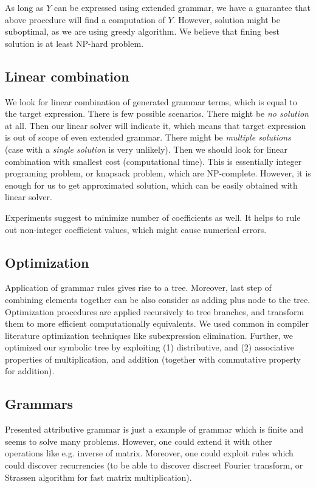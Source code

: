 \documentclass{article}
\begin{document}
As long as $Y$ can be expressed using extended grammar, we have a guarantee that above procedure will find a computation of $Y$. However, solution might be suboptimal, as we are using
greedy algorithm. We believe that fining best solution is at least NP-hard problem. 

\subsection{Linear combination}
We look for linear combination of generated grammar terms, which is equal to the
target expression. There is few possible scenarios. There might be \emph{no solution} at all. 
Then our linear solver will indicate it, which means that target expression
is out of scope of even extended grammar. There might be \emph{multiple solutions} (case
with a \emph{single solution} is very unlikely). Then we should look for linear combination
with smallest cost (computational time). 
This is essentially integer programing problem, or knapsack problem, which 
are NP-complete. However, it is enough for us to get approximated solution, which can be easily
obtained with linear solver.


Experiments suggest to minimize number of coefficients as well. It helps to rule out
non-integer coefficient values, which might cause numerical errors. 


\subsection{Optimization}

Application of grammar rules gives rise to a tree. Moreover, last step of
combining elements together can be also consider as adding plus node to the
tree. Optimization procedures are applied recursively to tree branches, and
transform them to more efficient computationally equivalents. We used common in
compiler literature optimization techniques like subexpression elimination.
Further, we optimized our symbolic tree by exploiting (1) distributive, and (2)
associative properties of multiplication, and addition (together with
commutative property for addition).

\subsection{Grammars}
Presented attributive grammar is just a example of grammar which is finite
and seems to solve many problems. However, one could extend it with 
other operations like e.g. inverse of matrix. Moreover, one could exploit
rules which could discover recurrencies (to be able to discover discreet Fourier transform, or
Strassen algorithm for fast matrix multiplication).
\end{document}
